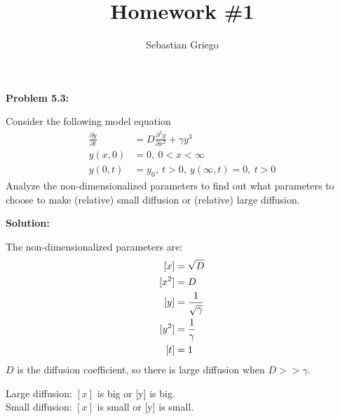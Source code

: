 \documentclass[12pt]{article}
\newenvironment{problem}[1]{
\textbf{Problem #1:}
}{
\rmfamily \vspace{1em}
}
\newenvironment{solution}{
\textbf{Solution:}

}{

\vspace{2em}
}
\begin{document}
\title{Homework \#1}  %
\author{Sebastian Griego}  %

\begin{problem}{5.3}
    Consider the following model equation
    \[
        \begin{aligned}
            \frac{\partial y}{\partial t} &= D\frac{\partial^2 y}{\partial x^2} + \gamma y^3 \\
            y(x,0) &= 0, \: 0 < x < \infty \\
            y(0,t) &= y_0, \: t > 0, \: y(\infty, t) = 0, \: t > 0
        \end{aligned}
    \]
    Analyze the non-dimensionalized parameters to find out what parameters to choose to make (relative) small diffusion or (relative) large diffusion.
\end{problem}

\begin{solution}
    The non-dimensionalized parameters are:
    \[
        \begin{aligned}\relax
            [x] &= \sqrt{D} \\
            [x^2] &= D \\
            [y] &= \frac{1}{\sqrt{\gamma}}\\
            [y^2] &= \frac{1}{\gamma}\\
            [t] &= 1
        \end{aligned}
    \]
    \(D\) is the diffusion coefficient, so there is large diffusion when \(D > > \gamma\).

    Large diffusion: \([x]\) is big or [y] is big.\\
    Small diffusion: \([x]\) is small or [y] is small.
\end{solution}
\end{document}
